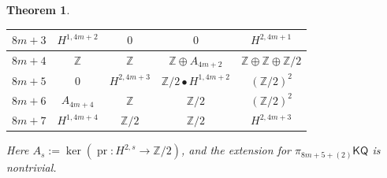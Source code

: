 \documentclass[11pt,hyp,english]{article}
\newcommand{\Z}{\mathbb{Z}}
\newcommand{\KQ}{\mathsf{KQ}}
\newcommand{\pr}{\operatorname{pr}}
\newtheorem{theorem}{Theorem}[section]
\theoremstyle{definition}
\begin{document}
\begin{theorem}
\begin{center}
\begin{tabular}{|l||c|c|c|c|}
        \hline
        $8m+3$ & $H^{1,4m+2}$ & $0$ & $0$ & $H^{2,4m+1}$ \\
        \hline
        $8m+4$ & $\Z$ & $\Z$ & $\Z\oplus A_{4m+2}$ &  $\Z\oplus \Z\oplus \Z/2$\\
        \hline
        $8m+5$ & $0$ & $H^{2,4m+3}$ & $\Z/2 \bullet H^{1,4m+2}$ & $(\Z/2)^2$ \\
        \hline
        $8m+6$ & $A_{4m+4}$ & $\Z$ & $\Z/2$ & $(\Z/2)^2$ \\
        \hline 
        $8m+7$ & $H^{1,4m+4}$ & $\Z/2$ & $\Z/2$ & $H^{2,4m+3}$\\
        \hline
         \end{tabular}
    \end{center}
    Here $A_s:=\ker (\pr \colon H^{2,s}\to \Z/2)$, and the extension for $\pi_{8m+5+(2)}\KQ$ is nontrivial.
\end{theorem} 
\end{document}
